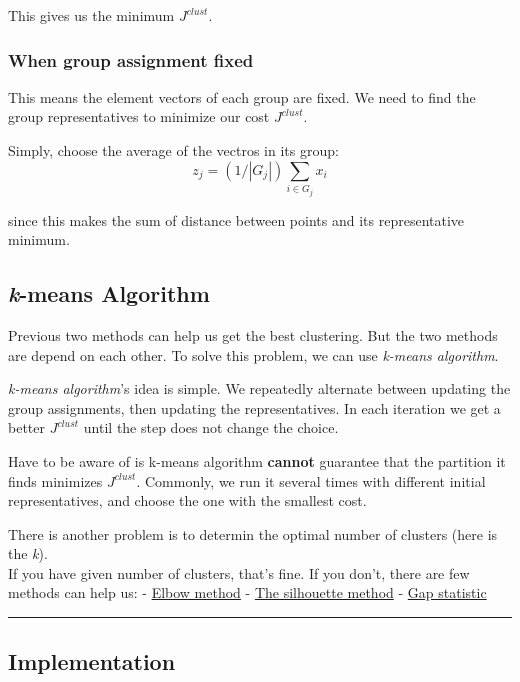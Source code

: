 \documentclass[11pt]{article}
\begin{document}
This gives us the minimum \(J^{clust}\).

\subsubsection{When group assignment
fixed}\label{when-group-assignment-fixed}

This means the element vectors of each group are fixed. We need to find
the group representatives to minimize our cost \(J^{clust}\).

Simply, choose the average of the vectros in its group:
\[ z_{j} = (1/|G_{j}|)\sum_{i\in G_{j}}x_{i}\]

since this makes the sum of distance between points and its
representative minimum.

\subsection{\texorpdfstring{\emph{k}-means
Algorithm}{k-means Algorithm}}\label{k-means-algorithm-1}

Previous two methods can help us get the best clustering. But the two
methods are depend on each other. To solve this problem, we can use
\emph{k-means algorithm}.

\emph{k-means algorithm}'s idea is simple. We repeatedly alternate
between updating the group assignments, then updating the
representatives. In each iteration we get a better \(J^{clust}\) until
the step does not change the choice.

Have to be aware of is k-means algorithm \textbf{cannot} guarantee that
the partition it finds minimizes \(J^{clust}\). Commonly, we run it
several times with different initial representatives, and choose the one
with the smallest cost.

There is another problem is to determin the optimal number of clusters
(here is the \emph{k}).\\
If you have given number of clusters, that's fine. If you don't, there
are few methods can help us: -
\href{https://en.wikipedia.org/wiki/Elbow_method_\%28clustering\%29}{Elbow
method} -
\href{https://en.wikipedia.org/wiki/Silhouette_\%28clustering\%29}{The
silhouette method} -
\href{http://web.stanford.edu/~hastie/Papers/gap.pdf}{Gap statistic}

\begin{center}\rule{0.5\linewidth}{\linethickness}\end{center}

    \subsection{Implementation}\label{implementation}
\end{document}
